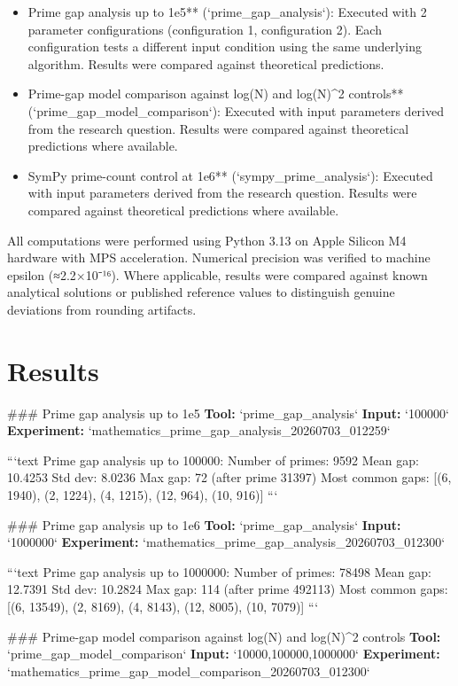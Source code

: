 \documentclass[11pt,a4paper]{article}
\begin{document}
\begin{itemize}
\item Prime gap analysis up to 1e5** (`prime\_gap\_analysis`): Executed with 2 parameter configurations (configuration 1, configuration 2). Each configuration tests a different input condition using the same underlying algorithm. Results were compared against theoretical predictions.
\item Prime-gap model comparison against log(N) and log(N)\textasciicircum{}2 controls** (`prime\_gap\_model\_comparison`): Executed with input parameters derived from the research question. Results were compared against theoretical predictions where available.
\item SymPy prime-count control at 1e6** (`sympy\_prime\_analysis`): Executed with input parameters derived from the research question. Results were compared against theoretical predictions where available.
\end{itemize}
All computations were performed using Python 3.13 on Apple Silicon M4 hardware with MPS acceleration. Numerical precision was verified to machine epsilon (≈2.2×10⁻¹⁶). Where applicable, results were compared against known analytical solutions or published reference values to distinguish genuine deviations from rounding artifacts.


\section{Results}
\#\#\# Prime gap analysis up to 1e5
\textbf{Tool:} `prime\_gap\_analysis`
\textbf{Input:} `100000`
\textbf{Experiment:} `mathematics\_prime\_gap\_analysis\_20260703\_012259`

```text
Prime gap analysis up to 100000:
  Number of primes: 9592
  Mean gap: 10.4253
  Std dev: 8.0236
  Max gap: 72 (after prime 31397)
  Most common gaps: [(6, 1940), (2, 1224), (4, 1215), (12, 964), (10, 916)]
```

\#\#\# Prime gap analysis up to 1e6
\textbf{Tool:} `prime\_gap\_analysis`
\textbf{Input:} `1000000`
\textbf{Experiment:} `mathematics\_prime\_gap\_analysis\_20260703\_012300`

```text
Prime gap analysis up to 1000000:
  Number of primes: 78498
  Mean gap: 12.7391
  Std dev: 10.2824
  Max gap: 114 (after prime 492113)
  Most common gaps: [(6, 13549), (2, 8169), (4, 8143), (12, 8005), (10, 7079)]
```

\#\#\# Prime-gap model comparison against log(N) and log(N)\textasciicircum{}2 controls
\textbf{Tool:} `prime\_gap\_model\_comparison`
\textbf{Input:} `10000,100000,1000000`
\textbf{Experiment:} `mathematics\_prime\_gap\_model\_comparison\_20260703\_012300`
\end{document}
